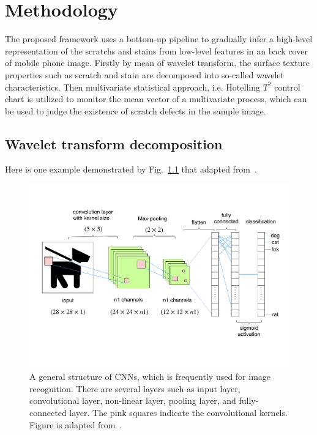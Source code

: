 \chapter{Methodology}
\label{cp:Methodology}

The proposed framework uses a bottom-up pipeline to 
gradually infer a high-level representation of the scratchs and stains from low-level features in an back cover of mobile phone image. Firstly by mean of wavelet transform, the surface texture properties such as scratch and stain are decomposed into so-called wavelet characteristics. Then multivariate statistical approach, i.e. Hotelling $T^{2}$ control chart is utilized to monitor the mean vector of a multivariate process, which can be used to judge the existence of scratch defects in the sample image. 

\section{Wavelet transform decomposition}




Here is one example demonstrated by Fig.~\ref{fig:cnn} that adapted from~\cite{hijazi2015using}. 

\begin{figure}[h]
\centering
\includegraphics[width=1\textwidth]{images/cnn.pdf}
\caption[Structure of CNNs]{A general structure of CNNs, which is frequently used for image recognition. There are several layers such as input layer, convolutional layer, non-linear layer, pooling layer, and fully-connected layer. The pink squares indicate
the convolutional kernels. Figure is adapted from~\cite{hijazi2015using}.}
\label{fig:cnn}
\end{figure}



